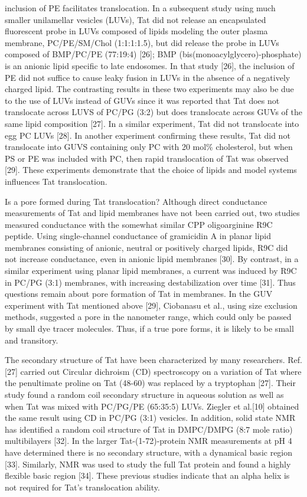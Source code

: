 inclusion of PE
facilitates translocation. In a subsequent study using much smaller unilamellar 
vesicles (LUVs),
Tat did not release an encapsulated fluorescent probe in LUVs composed of 
lipids modeling the
outer plasma membrane, PC/PE/SM/Chol (1:1:1:1.5), but did release the probe in 
LUVs
composed of BMP/PC/PE (77:19:4) [26]; BMP (bis(monoacylglycero)-phosphate) is 
an anionic
lipid specific to late endosomes. In that study [26], the inclusion of PE did 
not suffice to cause
leaky fusion in LUVs in the absence of a negatively charged lipid. The 
contrasting results in
these two experiments may also be due to the use of LUVs instead of GUVs since 
it was reported
that Tat does not translocate across LUVS of PC/PG (3:2) but does translocate 
across GUVs of
the same lipid composition [27]. In a similar experiment, Tat did not 
translocate into egg PC
LUVs [28]. In another experiment confirming these results, Tat did not 
translocate into GUVS
containing only PC with 20 mol\% cholesterol, but when PS or PE was included 
with PC, then
rapid translocation of Tat was observed [29]. These experiments demonstrate 
that the choice of
lipids and model systems influences Tat translocation.

Is a pore formed during Tat translocation? Although direct conductance 
measurements of
Tat and lipid membranes have not been carried out, two studies measured 
conductance with the
somewhat similar CPP oligoarginine R9C peptide. Using single-channel 
conductance of
gramicidin A in planar lipid membranes consisting of anionic, neutral or 
positively charged
lipids, R9C did not increase conductance, even in anionic lipid membranes [30]. 
By contrast, in
a similar experiment using planar lipid membranes, a current was induced by R9C 
in PC/PG
(3:1) membranes, with increasing destabilization over time [31]. Thus questions 
remain about
pore formation of Tat in membranes. In the GUV experiment with Tat mentioned 
above [29],
Ciobanasu et al., using size exclusion methods, suggested a pore in the 
nanometer range, which
could only be passed by small dye tracer molecules. Thus, if a true pore forms, 
it is likely to be
small and transitory.

The secondary structure of Tat have been characterized by many researchers. 
Ref.[27] carried out Circular dichroism (CD) spectroscopy on a variation of Tat
where the penultimate proline on Tat (48-60) was replaced by a
tryptophan [27]. Their study found a random coil secondary structure in aqueous 
solution as well as when Tat was mixed with PC/PG/PE (65:35:5) LUVs. 
Ziegler et al.[10] obtained the same result using CD in PC/PG (3:1) vesicles. 
In addition, solid state NMR has identified a random coil structure of Tat in
DMPC/DMPG (8:7 mole ratio) multibilayers [32]. In the larger Tat-(1-72)-protein 
NMR 
measurements at pH 4 have determined there is no secondary structure, with a 
dynamical basic
region [33]. Similarly, NMR was used to study the full Tat protein and found a 
highly flexible
basic region [34].
These previous studies indicate that 
an alpha helix is not required for Tat’s translocation ability. 

